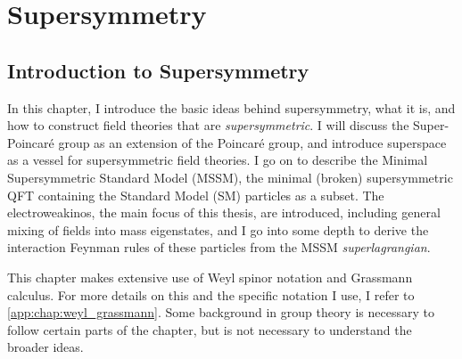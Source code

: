 \documentclass[../main.tex]{subfiles}
\begin{document}
\chapter{Supersymmetry}
\label{chap:susy}


\section{Introduction to Supersymmetry}
\label{susy:sec:introduction}
In this chapter, I introduce the basic ideas behind supersymmetry, what it is, and how to construct field theories that are \emph{supersymmetric}.
I will discuss the Super-Poincaré group as an extension of the Poincaré group, and introduce superspace as a vessel for supersymmetric field theories.
I go on to describe the Minimal Supersymmetric Standard Model (MSSM), the minimal (broken) supersymmetric QFT containing the Standard Model (SM) particles as a subset.
The electroweakinos, the main focus of this thesis, are introduced, including general mixing of fields into mass eigenstates, and I go into some depth to derive the interaction Feynman rules of these particles from the MSSM \emph{superlagrangian}.

This chapter makes extensive use of Weyl spinor notation and Grassmann calculus. For more details on this and the specific notation I use, I refer to \cref{app:chap:weyl_grassmann}.
Some background in group theory is necessary to follow certain parts of the chapter, but is not necessary to understand the broader ideas.
\end{document}

